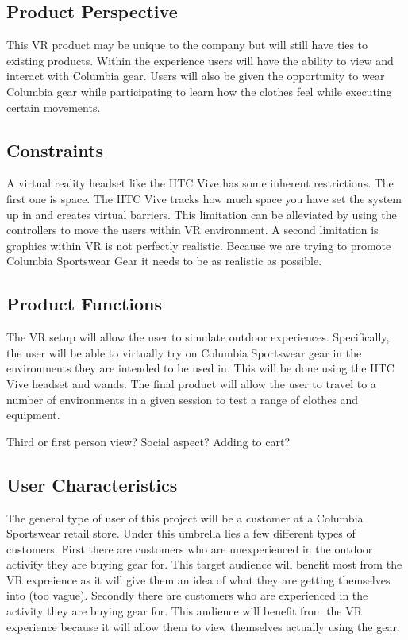 \documentclass[10pt, oneside,onecolumn,draftclsnofoot]{IEEEtran}
\begin{document}
\subsection{Product Perspective}
This VR product may be unique to the company but will still have ties to
existing products. Within the experience users will have the ability to view
and interact with Columbia gear. Users will also be given the opportunity to
wear Columbia gear while participating to learn how the clothes feel while
executing certain movements.

\subsection{Constraints}
A virtual reality headset like the HTC Vive has some inherent restrictions.
The first one is space. The HTC Vive tracks how much space you have set the
system up in and creates virtual barriers. This limitation can be alleviated by
using the controllers to move the users within VR environment. A second
limitation is graphics within VR is not perfectly realistic. Because we are
trying to promote Columbia Sportswear Gear it needs to be as realistic as
possible.

\subsection{Product Functions}
The VR setup will allow the user to simulate outdoor experiences.
Specifically, the user will be able to virtually try on Columbia Sportswear
gear in the environments they are intended to be used in.
This will be done using the HTC Vive headset and wands. The final product
will allow the user to travel to a number of environments in a given session to
test a range of clothes and equipment.

Third or first person view?
Social aspect? Adding to cart?

\subsection{User Characteristics}
The general type of user of this project will be a customer at a Columbia
Sportswear retail store. Under this umbrella lies a few different types of
customers. First there are customers who are unexperienced in the outdoor
activity they are buying gear for. This target audience will benefit most
from the VR expreience as it will give them an idea of what they
are getting themselves into (too vague). Secondly there are customers who are
experienced in the activity they are buying gear for. This audience will
benefit from the VR experience because it will allow them to view themselves
actually using the gear.
\end{document}
